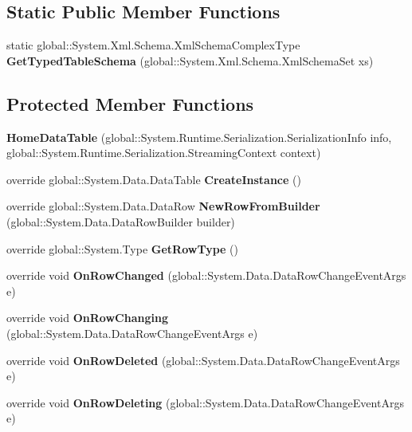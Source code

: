 \subsection*{Static Public Member Functions}
\begin{DoxyCompactItemize}
\item 
\mbox{\label{class_a_f_h___scheduler_1_1_home_inspection_db_data_set_1_1_home_data_table_a7016a80c047a8285f90c9d7dc3b5cb36}} 
static global\+::\+System.\+Xml.\+Schema.\+Xml\+Schema\+Complex\+Type {\bfseries Get\+Typed\+Table\+Schema} (global\+::\+System.\+Xml.\+Schema.\+Xml\+Schema\+Set xs)
\end{DoxyCompactItemize}
\subsection*{Protected Member Functions}
\begin{DoxyCompactItemize}
\item 
\mbox{\label{class_a_f_h___scheduler_1_1_home_inspection_db_data_set_1_1_home_data_table_aed19881a736176056b84a7afb3818502}} 
{\bfseries Home\+Data\+Table} (global\+::\+System.\+Runtime.\+Serialization.\+Serialization\+Info info, global\+::\+System.\+Runtime.\+Serialization.\+Streaming\+Context context)
\item 
\mbox{\label{class_a_f_h___scheduler_1_1_home_inspection_db_data_set_1_1_home_data_table_a86ca8bbc2d948372f8b6dfb2924513fd}} 
override global\+::\+System.\+Data.\+Data\+Table {\bfseries Create\+Instance} ()
\item 
\mbox{\label{class_a_f_h___scheduler_1_1_home_inspection_db_data_set_1_1_home_data_table_ad0e4bc7243ab1eb2a6599d32ed721cef}} 
override global\+::\+System.\+Data.\+Data\+Row {\bfseries New\+Row\+From\+Builder} (global\+::\+System.\+Data.\+Data\+Row\+Builder builder)
\item 
\mbox{\label{class_a_f_h___scheduler_1_1_home_inspection_db_data_set_1_1_home_data_table_aa7cf0340d57babd99974e184d6297dad}} 
override global\+::\+System.\+Type {\bfseries Get\+Row\+Type} ()
\item 
\mbox{\label{class_a_f_h___scheduler_1_1_home_inspection_db_data_set_1_1_home_data_table_a8a9650da763c1bf0f76e8b3fda4ac0b7}} 
override void {\bfseries On\+Row\+Changed} (global\+::\+System.\+Data.\+Data\+Row\+Change\+Event\+Args e)
\item 
\mbox{\label{class_a_f_h___scheduler_1_1_home_inspection_db_data_set_1_1_home_data_table_abbccaa79c9eb83e830023db1d1f853ab}} 
override void {\bfseries On\+Row\+Changing} (global\+::\+System.\+Data.\+Data\+Row\+Change\+Event\+Args e)
\item 
\mbox{\label{class_a_f_h___scheduler_1_1_home_inspection_db_data_set_1_1_home_data_table_a19440a7bbe4313479e1f0d5d52305643}} 
override void {\bfseries On\+Row\+Deleted} (global\+::\+System.\+Data.\+Data\+Row\+Change\+Event\+Args e)
\item 
\mbox{\label{class_a_f_h___scheduler_1_1_home_inspection_db_data_set_1_1_home_data_table_a0f07521f5fe109fcd0f34aa48ce5c8e1}} 
override void {\bfseries On\+Row\+Deleting} (global\+::\+System.\+Data.\+Data\+Row\+Change\+Event\+Args e)
\end{DoxyCompactItemize}
